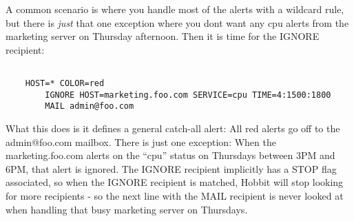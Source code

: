  A common scenario is where you handle most of the alerts with a wildcard rule, but there is \emph{just}
 that one exception where you dont want any cpu alerts from the marketing server on Thursday afternoon. Then it is time for the IGNORE recipient:
\begin{verbatim}

	HOST=* COLOR=red
		IGNORE HOST=marketing.foo.com SERVICE=cpu TIME=4:1500:1800
		MAIL admin@foo.com

\end{verbatim}



 What this does is it defines a general catch-all alert: All red alerts go off to the admin@foo.com mailbox. There is just one exception: When the marketing.foo.com alerts on the ``cpu'' status on Thursdays between 3PM and 6PM, that alert is ignored. The IGNORE recipient implicitly has a STOP flag associated, so when the IGNORE recipient is matched, Hobbit will stop looking for more recipients - so the next line with the MAIL recipient is never looked at when handling that busy marketing server on Thursdays.

